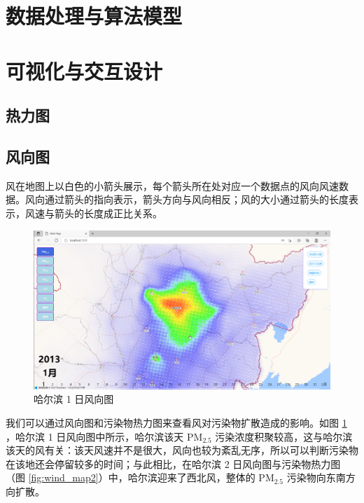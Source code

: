 \documentclass[UTF8]{ctexrep}
\begin{document}
    \section{数据处理与算法模型}

    \section{可视化与交互设计}

    \subsection{热力图}
    

    \subsection{风向图}
    
	风在地图上以白色的小箭头展示，每个箭头所在处对应一个数据点的风向风速数据。风向通过箭头的指向表示，箭头方向与风向相反；风的大小通过箭头的长度表示，风速与箭头的长度成正比关系。
    
	\begin{figure}[h!]
        \centering
        \includegraphics[width=15cm,keepaspectratio]{images/wind_map1.png}
        \caption{哈尔滨 1 日风向图}
        \label{fig:wind_map1}
    \end{figure}
    
    我们可以通过风向图和污染物热力图来查看风对污染物扩散造成的影响。如图 \ref{fig:wind_map1} ，哈尔滨 1 日风向图中所示，哈尔滨该天 $\mathrm{PM}_{2.5}$ 污染浓度积聚较高，这与哈尔滨该天的风有关：该天风速并不是很大，风向也较为紊乱无序，所以可以判断污染物在该地还会停留较多的时间；与此相比，在哈尔滨 2 日风向图与污染物热力图（图 \ref{fig:wind_map2}）中，哈尔滨迎来了西北风，整体的 $\mathrm{PM}_{2.5}$ 污染物向东南方向扩散。
    
\end{document}
